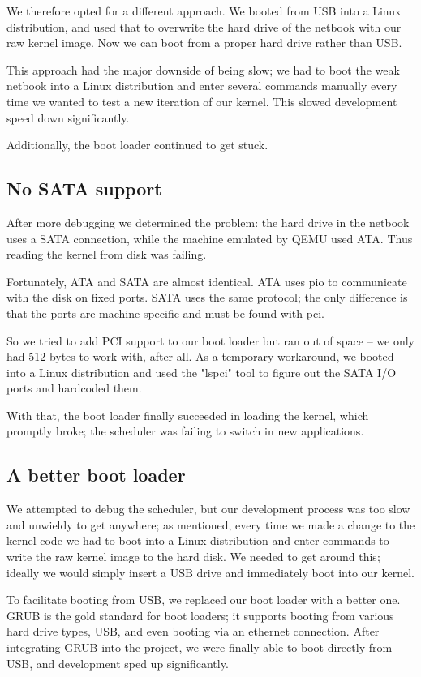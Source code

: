 \documentclass{article}
\begin{document}
We therefore opted for a different approach. We booted from USB into a Linux
distribution, and used that to overwrite the hard drive of the netbook with
our raw kernel image. Now we can boot from a proper hard drive rather than
USB.

This approach had the major downside of being slow; we had to boot the weak
netbook into a Linux distribution and enter several commands manually every
time we wanted to test a new iteration of our kernel. This slowed development
speed down significantly.

Additionally, the boot loader continued to get stuck.


\subsection{No SATA support}
After more debugging we determined the problem: the hard drive in the netbook
uses a SATA connection, while the machine emulated by QEMU used ATA. Thus
reading the kernel from disk was failing.

Fortunately, ATA and SATA are almost identical. ATA uses \gls{pio} to
communicate with the disk on fixed ports. SATA uses the same protocol; the
only difference is that the ports are machine-specific and must be found with
\gls{pci}.

So we tried to add PCI support to our boot loader but ran out of space -- we
only had 512 bytes to work with, after all. As a temporary workaround, we
booted into a Linux distribution and used the "lspci" tool to figure out the
SATA I/O ports and hardcoded them. 

With that, the boot loader finally succeeded in loading the kernel, which
promptly broke; the scheduler was failing to switch in new applications.


\subsection{A better boot loader}
We attempted to debug the scheduler, but our development process was too slow
and unwieldy to get anywhere; as mentioned, every time we made a change to the
kernel code we had to boot into a Linux distribution and enter commands to
write the raw kernel image to the hard disk. We needed to get around this;
ideally we would simply insert a USB drive and immediately boot into our
kernel. 

To facilitate booting from USB, we replaced our boot loader with a better one.
GRUB is the gold standard for boot loaders; it supports booting from various
hard drive types, USB, and even booting via an ethernet connection. After
integrating GRUB into the project, we were finally able to boot directly from
USB, and development sped up significantly.
\end{document}
